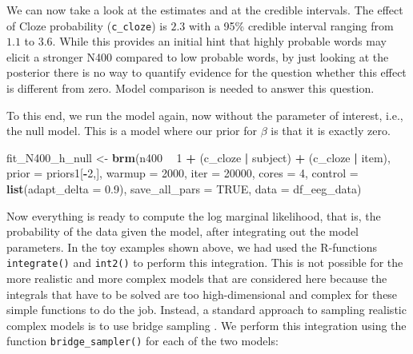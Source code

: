 \documentclass[12pt,]{krantz}
\newenvironment{Shaded}{\begin{snugshade}}{\end{snugshade}}
\newcommand{\DataTypeTok}[1]{\textcolor[rgb]{0.13,0.29,0.53}{#1}}
\newcommand{\DecValTok}[1]{\textcolor[rgb]{0.00,0.00,0.81}{#1}}
\newcommand{\FloatTok}[1]{\textcolor[rgb]{0.00,0.00,0.81}{#1}}
\newcommand{\KeywordTok}[1]{\textcolor[rgb]{0.13,0.29,0.53}{\textbf{#1}}}
\newcommand{\NormalTok}[1]{#1}
\newcommand{\OperatorTok}[1]{\textcolor[rgb]{0.81,0.36,0.00}{\textbf{#1}}}
\newcommand{\OtherTok}[1]{\textcolor[rgb]{0.56,0.35,0.01}{#1}}
\newcommand{\StringTok}[1]{\textcolor[rgb]{0.31,0.60,0.02}{#1}}
\theoremstyle{definition}
\theoremstyle{definition}
\theoremstyle{definition}
\theoremstyle{remark}
\begin{document}
We can now take a look at the estimates and at the credible intervals. The effect of Cloze probability (\texttt{c\_cloze}) is \(2.3\) with a 95\% credible interval ranging from \(1.1\) to \(3.6\). While this provides an initial hint that highly probable words may elicit a stronger N400 compared to low probable words, by just looking at the posterior there is no way to quantify evidence for the question whether this effect is different from zero. Model comparison is needed to answer this question.

To this end, we run the model again, now without the parameter of interest, i.e., the null model. This is a model where our prior for \(\beta\) is that it is exactly zero.

\begin{Shaded}
\begin{Highlighting}[]
\NormalTok{fit_N400_h_null <-}\StringTok{ }\KeywordTok{brm}\NormalTok{(n400 }\OperatorTok{~}\StringTok{ }\DecValTok{1} \OperatorTok{+}\StringTok{ }
\StringTok{    }\NormalTok{(c_cloze }\OperatorTok{|}\StringTok{ }\NormalTok{subject) }\OperatorTok{+}\StringTok{ }\NormalTok{(c_cloze }\OperatorTok{|}\StringTok{ }\NormalTok{item),}
    \DataTypeTok{prior   =}\NormalTok{ priors1[}\OperatorTok{-}\DecValTok{2}\NormalTok{,],}
    \DataTypeTok{warmup  =} \DecValTok{2000}\NormalTok{,}
    \DataTypeTok{iter    =} \DecValTok{20000}\NormalTok{,}
    \DataTypeTok{cores   =} \DecValTok{4}\NormalTok{,}
    \DataTypeTok{control =} \KeywordTok{list}\NormalTok{(}\DataTypeTok{adapt_delta =} \FloatTok{0.9}\NormalTok{),}
    \DataTypeTok{save_all_pars =} \OtherTok{TRUE}\NormalTok{,}
    \DataTypeTok{data    =}\NormalTok{ df_eeg_data)}
\end{Highlighting}
\end{Shaded}

Now everything is ready to compute the log marginal likelihood, that is, the probability of the data given the model, after integrating out the model parameters. In the toy examples shown above, we had used the R-functions \texttt{integrate()} and \texttt{int2()} to perform this integration. This is not possible for the more realistic and more complex models that are considered here because the integrals that have to be solved are too high-dimensional and complex for these simple functions to do the job. Instead, a standard approach to sampling realistic complex models is to use bridge sampling \citep{gronauTutorialBridgeSampling2017, gronauBridgesamplingPackageEstimating2017}. We perform this integration using the function \texttt{bridge\_sampler()} for each of the two models:
\end{document}

